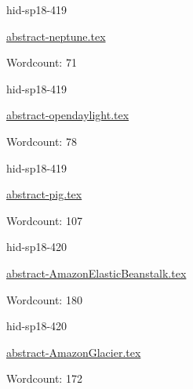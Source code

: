 

\begin{IU}

hid-sp18-419

\href{https://github.com/cloudmesh-community/hid-sp18-419/blob/master//technology/abstract-neptune.tex}{abstract-neptune.tex}

 

Wordcount: 71

\end{IU}



\begin{IU}

hid-sp18-419

\href{https://github.com/cloudmesh-community/hid-sp18-419/blob/master//technology/abstract-opendaylight.tex}{abstract-opendaylight.tex}

 

Wordcount: 78

\end{IU}



\begin{IU}

hid-sp18-419

\href{https://github.com/cloudmesh-community/hid-sp18-419/blob/master//technology/abstract-pig.tex}{abstract-pig.tex}

 

Wordcount: 107

\end{IU}



\begin{IU}

hid-sp18-420

\href{https://github.com/cloudmesh-community/hid-sp18-420/blob/master//technology/abstract-AmazonElasticBeanstalk.tex}{abstract-AmazonElasticBeanstalk.tex}

 

Wordcount: 180

\end{IU}



\begin{IU}

hid-sp18-420

\href{https://github.com/cloudmesh-community/hid-sp18-420/blob/master//technology/abstract-AmazonGlacier.tex}{abstract-AmazonGlacier.tex}

 

Wordcount: 172

\end{IU}

